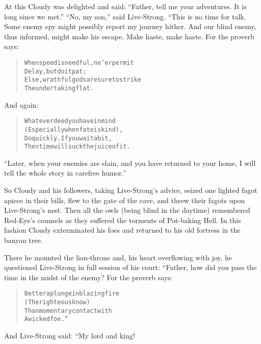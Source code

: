 \documentclass[article, twoside, 14pt]{memoir}
\renewenvironment{verbatim}{%
\begin{quote}%
\vskip -10pt%
\begin{alltt}\normalfont\large}{\end{alltt}%
\end{quote}%
\vskip -10pt
} %
\begin{document}
At this Cloudy was delighted and said:
``Father, tell me your adventures. It is long since we met.''
``No, my son,'' said Live-Strong. “This is no time for talk. Some
enemy spy might possibly report my journey hither. And our blind
enemy, thus informed, might make his escape. Make haste, make
haste. For the proverb says:

\begin{verbatim}
When speed is needful, ne'er permit
    Delay, but do it pat;
Else, wrathful gods are sure to strike
    The undertaking flat.
\end{verbatim}
And again:

\begin{verbatim}
Whatever deed you have in mind
(Especially when fate is kind),
Do quickly. If you wait a bit,
Then time will suck the juice of it.
\end{verbatim}
``Later, when your enemies are slain, and you have returned to your home, I will tell the whole story in carefree humor.''

So Cloudy and his followers, taking Live-Strong's advice,
seized one lighted fagot apiece in their bills, flew to the gate of
the cave, and threw their fagots upon Live-Strong's nest. Then all
the owls (being blind in the daytime) remembered Red-Eye's counsels
as they suffered the torments of Pot-baking Hell. In this fashion
Cloudy exterminated his foes and returned to his old fortress in
the banyan tree.

There he mounted the lion-throne and, his heart overflowing with
joy, he questioned Live-Strong in full session of his court:
“Father, how did you pass the time in the midst of the enemy? For
the proverb says:

\begin{verbatim}
Better a plunge in blazing fire
    (The righteous know)
Than momentary contact with
    A wicked foe.”
\end{verbatim}
And Live-Strong said: “My lord and king!
\end{document}
